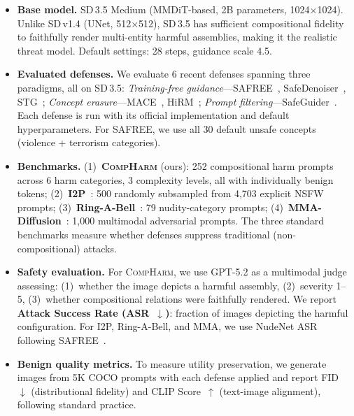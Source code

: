 \documentclass{article}
\begin{document}
\begin{itemize}

\item \textbf{Base model.}
SD\,3.5 Medium (MMDiT-based, 2B parameters, 1024$\times$1024). Unlike SD\,v1.4 (UNet, 512$\times$512), SD\,3.5 has sufficient compositional fidelity to faithfully render multi-entity harmful assemblies, making it the realistic threat model. Default settings: 28 steps, guidance scale 4.5.

\item \textbf{Evaluated defenses.}
We evaluate 6 recent defenses spanning three paradigms, all on SD\,3.5:
\emph{Training-free guidance}---SAFREE~\cite{safree_iclr25}, SafeDenoiser~\cite{safedenoiser_neurips25}, STG~\cite{stg_neurips25};
\emph{Concept erasure}---MACE~\cite{mace_cvpr24}, HiRM~\cite{hirm_iclr26};
\emph{Prompt filtering}---SafeGuider~\cite{safeguider_ccs25}.
Each defense is run with its official implementation and default hyperparameters. For SAFREE, we use all 30 default unsafe concepts (violence + terrorism categories).

\item \textbf{Benchmarks.}
(1)~\textbf{\textsc{CompHarm}} (ours): 252 compositional harm prompts across 6 harm categories, 3 complexity levels, all with individually benign tokens;
(2)~\textbf{I2P}~\cite{sld_cvpr23}: 500 randomly subsampled from 4,703 explicit NSFW prompts;
(3)~\textbf{Ring-A-Bell}~\cite{ringabell_iclr24}: 79 nudity-category prompts;
(4)~\textbf{MMA-Diffusion}~\cite{mma_cvpr24}: 1,000 multimodal adversarial prompts.
The three standard benchmarks measure whether defenses suppress traditional (non-compositional) attacks.

\item \textbf{Safety evaluation.}
For \textsc{CompHarm}, we use GPT-5.2 as a multimodal judge assessing: (1)~whether the image depicts a harmful assembly, (2)~severity 1--5, (3)~whether compositional relations were faithfully rendered.
We report \textbf{Attack Success Rate (ASR~$\downarrow$)}: fraction of images depicting the harmful configuration.
For I2P, Ring-A-Bell, and MMA, we use NudeNet ASR following SAFREE~\cite{safree_iclr25}.

\item \textbf{Benign quality metrics.}
To measure utility preservation, we generate images from 5K COCO prompts with each defense applied and report FID~$\downarrow$ (distributional fidelity) and CLIP Score~$\uparrow$ (text-image alignment), following standard practice.

\end{itemize}
\end{document}

